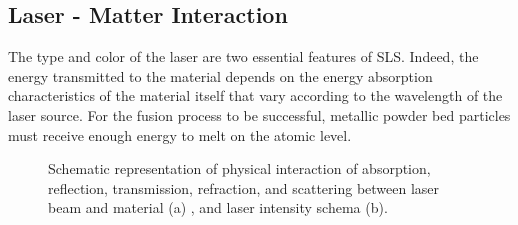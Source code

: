 \subsection{Laser - Matter Interaction}
\label{subsec:sintering}
The type and color of the laser are two essential features of SLS. Indeed, the energy transmitted to the material depends on the energy absorption characteristics of the material itself that vary according to the wavelength of the laser source. For the fusion process to be successful, metallic powder bed particles must receive enough energy to melt on the atomic level.
\begin{figure}
    \centering
    \qquad
    
    \caption[Laser interactions and laser intensity.]{Schematic representation of physical interaction of absorption, reflection, transmission, refraction, and scattering between laser beam and material (a) \cite{katayama_fundamentals_2020}, and laser intensity schema (b).}
\end{figure}
